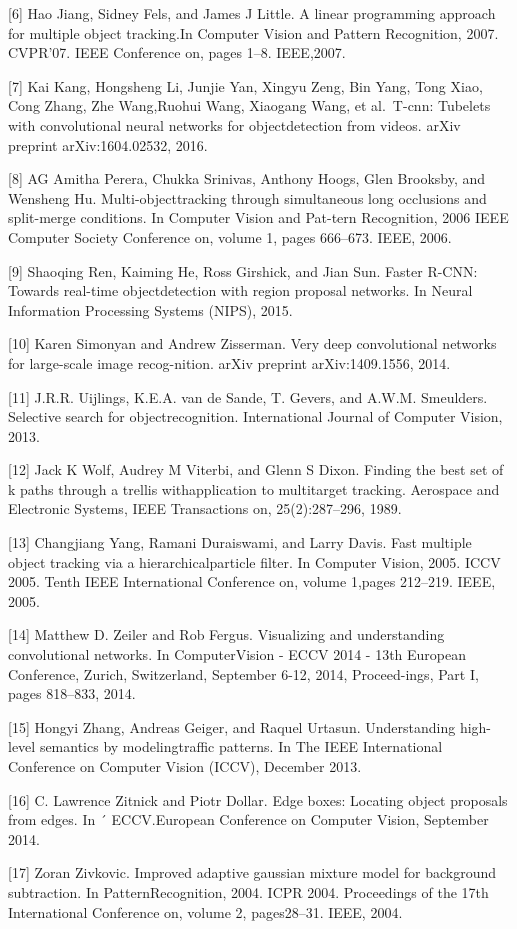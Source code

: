 \documentclass[
  10
]{article}
\begin{document}
{[}6{]} Hao Jiang, Sidney Fels, and James J Little. A linear programming
approach for multiple object tracking.In Computer Vision and Pattern
Recognition, 2007. CVPR'07. IEEE Conference on, pages 1--8. IEEE,2007.

{[}7{]} Kai Kang, Hongsheng Li, Junjie Yan, Xingyu Zeng, Bin Yang, Tong
Xiao, Cong Zhang, Zhe Wang,Ruohui Wang, Xiaogang Wang, et al.~T-cnn:
Tubelets with convolutional neural networks for objectdetection from
videos. arXiv preprint arXiv:1604.02532, 2016.

{[}8{]} AG Amitha Perera, Chukka Srinivas, Anthony Hoogs, Glen Brooksby,
and Wensheng Hu. Multi-objecttracking through simultaneous long
occlusions and split-merge conditions. In Computer Vision and Pat-tern
Recognition, 2006 IEEE Computer Society Conference on, volume 1, pages
666--673. IEEE, 2006.

{[}9{]} Shaoqing Ren, Kaiming He, Ross Girshick, and Jian Sun. Faster
R-CNN: Towards real-time objectdetection with region proposal networks.
In Neural Information Processing Systems (NIPS), 2015.

{[}10{]} Karen Simonyan and Andrew Zisserman. Very deep convolutional
networks for large-scale image recog-nition. arXiv preprint
arXiv:1409.1556, 2014.

{[}11{]} J.R.R. Uijlings, K.E.A. van de Sande, T. Gevers, and A.W.M.
Smeulders. Selective search for objectrecognition. International Journal
of Computer Vision, 2013.

{[}12{]} Jack K Wolf, Audrey M Viterbi, and Glenn S Dixon. Finding the
best set of k paths through a trellis withapplication to multitarget
tracking. Aerospace and Electronic Systems, IEEE Transactions on,
25(2):287--296, 1989.

{[}13{]} Changjiang Yang, Ramani Duraiswami, and Larry Davis. Fast
multiple object tracking via a hierarchicalparticle filter. In Computer
Vision, 2005. ICCV 2005. Tenth IEEE International Conference on, volume
1,pages 212--219. IEEE, 2005.

{[}14{]} Matthew D. Zeiler and Rob Fergus. Visualizing and understanding
convolutional networks. In ComputerVision - ECCV 2014 - 13th European
Conference, Zurich, Switzerland, September 6-12, 2014, Proceed-ings,
Part I, pages 818--833, 2014.

{[}15{]} Hongyi Zhang, Andreas Geiger, and Raquel Urtasun. Understanding
high-level semantics by modelingtraffic patterns. In The IEEE
International Conference on Computer Vision (ICCV), December 2013.

{[}16{]} C. Lawrence Zitnick and Piotr Dollar. Edge boxes: Locating
object proposals from edges. In ´ ECCV.European Conference on Computer
Vision, September 2014.

{[}17{]} Zoran Zivkovic. Improved adaptive gaussian mixture model for
background subtraction. In PatternRecognition, 2004. ICPR 2004.
Proceedings of the 17th International Conference on, volume 2,
pages28--31. IEEE, 2004.
\end{document}
